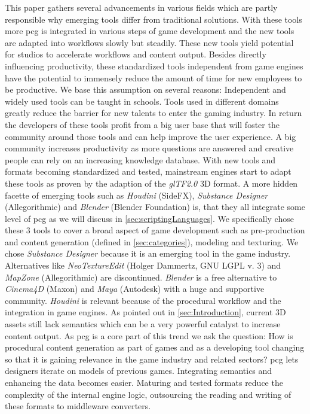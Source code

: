 \documentclass[10pt,a4paper]{article}
\begin{document}
\begin{multicols}{2}
This paper gathers several advancements in various fields which are partly responsible why emerging tools differ from traditional solutions. With these tools more \gls{pcg} is integrated in various steps of game development and the new tools are adapted into workflows slowly but steadily. These new tools yield potential for studios to accelerate workflows and content output. Besides directly influencing productivity, these standardized tools independent from game engines have the potential to immensely reduce the amount of time for new employees to be productive. We base this assumption on several reasons: Independent and widely used tools can be taught in schools. Tools used in different domains greatly reduce the barrier for new talents to enter the gaming industry. In return the developers of these tools profit from a big user base that will foster the community around those tools and can help improve the user experience. A big community increases productivity as more questions are answered and creative people can rely on an increasing knowledge database. With new tools and formats becoming standardized and tested, mainstream engines start to adapt these tools as proven by the adaption of the \textit{glTF2.0} 3D format\cite{Group2018}. A more hidden facette of emerging tools such as \textit{Houdini} (SideFX), \textit{Substance Designer} (Allegorithmic) and \textit{Blender} (Blender Foundation) is, that they all integrate some level of \gls{pcg} as we will discuss in \autoref{sec:scriptingLanguages}. We specifically chose these 3 tools to cover a broad aspect of game development such as pre-production and content generation (defined in \autoref{sec:categories}), modeling and texturing. We chose \textit{Substance Designer} because it is an emerging tool in the game industry. Alternatives like \textit{NeoTextureEdit} (Holger Dammertz, GNU LGPL v. 3) and \textit{MapZone} (Allegorithmic) are discontinued. \textit{Blender} is a free alternative to \textit{Cinema4D} (Maxon) and \textit{Maya} (Autodesk) with a huge and supportive community. \textit{Houdini} is relevant because of the procedural workflow and the integration in game engines. As pointed out in \autoref{sec:Introduction}, current 3D assets still lack semantics which can be a very powerful catalyst to increase content output. As \gls{pcg} is a core part of this trend we ask the question: How is procedural content generation as part of games and as a developing tool changing so that it is gaining relevance in the game industry and related sectors? \gls{pcg} lets designers iterate on models of previous games. Integrating semantics and enhancing the data becomes easier. Maturing and tested formats reduce the complexity of the internal engine logic, outsourcing the reading and writing of these formats to middleware converters.
\end{multicols}
\end{document}
